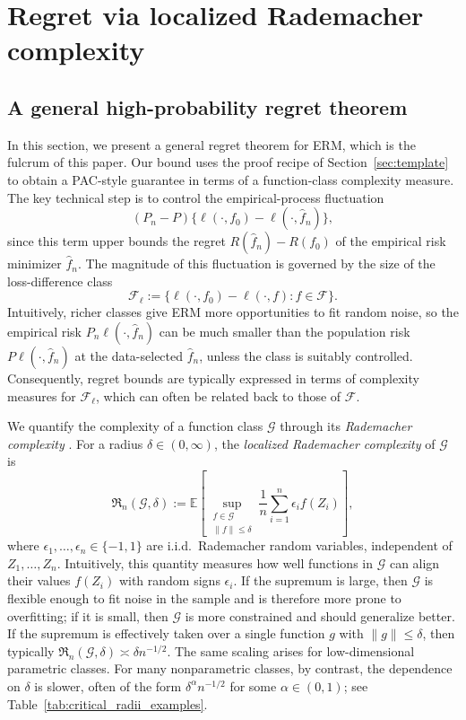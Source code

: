 \documentclass[11pt]{article}
\theoremstyle{plain}
\theoremstyle{definition} %
\begin{document}
\section{Regret via localized Rademacher complexity}

\subsection{A general high-probability regret theorem}
\label{sec:genregret}
In this section, we present a general regret theorem for ERM, which is the fulcrum of this paper. Our bound uses the proof recipe of Section~\ref{sec:template} to obtain a PAC-style guarantee in terms of a function-class complexity measure. The key technical step is to control the empirical-process fluctuation
\[
(P_n-P)\{\ell(\cdot,f_0)-\ell(\cdot,\hat f_n)\},
\]
since this term upper bounds the regret $R(\hat f_n)-R(f_0)$ of the empirical risk minimizer $\hat f_n$. The magnitude of this fluctuation is governed by the size of the loss-difference class
\[
\mathcal F_{\ell} := \{\ell(\cdot,f_0)-\ell(\cdot,f) : f\in\mathcal F\}.
\]
Intuitively, richer classes give ERM more opportunities to fit random noise, so the empirical risk $P_n\ell(\cdot,\hat f_n)$ can be much smaller than the population risk $P\ell(\cdot,\hat f_n)$ at the data-selected $\hat f_n$, unless the class is suitably controlled. Consequently, regret bounds are typically expressed in terms of complexity measures for $\mathcal F_{\ell}$, which can often be related back to those of $\mathcal F$.


We quantify the complexity of a function class \(\mathcal{G}\) through its \emph{Rademacher complexity} \citep{bartlett2002rademacher, bartlett2005local, wainwright2019high}. For a radius \(\delta \in (0,\infty)\), the \emph{localized Rademacher complexity} of \(\mathcal{G}\) is
\[
\mathfrak{R}_n(\mathcal G,\delta)
:=
\mathbb{E}\left[
\sup_{\substack{f \in \mathcal{G}\\ \|f\| \le \delta}}
\frac{1}{n} \sum_{i=1}^n \epsilon_i f(Z_i)
\right],
\]
where \(\epsilon_1,\ldots,\epsilon_n \in \{-1,1\}\) are i.i.d.\ Rademacher random variables, independent of \(Z_1,\ldots,Z_n\). Intuitively, this quantity measures how well functions in \(\mathcal{G}\) can align their values \(f(Z_i)\) with random signs \(\epsilon_i\). If the supremum is large, then \(\mathcal{G}\) is flexible enough to fit noise in the sample and is therefore more prone to overfitting; if it is small, then \(\mathcal{G}\) is more constrained and should generalize better. If the supremum is effectively taken over a single function \(g\) with \(\|g\|\le \delta\), then typically \(\mathfrak{R}_n(\mathcal G,\delta)\asymp \delta n^{-1/2}\). The same scaling arises for low-dimensional parametric classes. For many nonparametric classes, by contrast, the dependence on \(\delta\) is slower, often of the form \(\delta^{\alpha}n^{-1/2}\) for some \(\alpha\in(0,1)\); see Table~\ref{tab:critical_radii_examples}.
 
\end{document}

